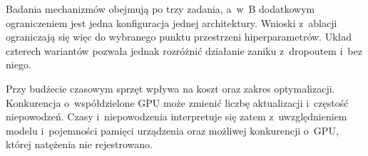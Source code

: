 Badania mechanizmów obejmują po trzy zadania, a~w~B dodatkowym ograniczeniem jest jedna konfiguracja jednej architektury. Wnioski z~ablacji ograniczają się więc do wybranego punktu przestrzeni hiperparametrów. Układ czterech wariantów pozwala jednak rozróżnić działanie zaniku z~dropoutem i~bez niego.

Przy budżecie czasowym sprzęt wpływa na koszt oraz zakres optymalizacji. Konkurencja o~współdzielone GPU może zmienić liczbę aktualizacji i~częstość niepowodzeń. Czasy i~niepowodzenia interpretuje się zatem z~uwzględnieniem modelu i~pojemności pamięci urządzenia oraz możliwej konkurencji o~GPU, której natężenia nie rejestrowano.
